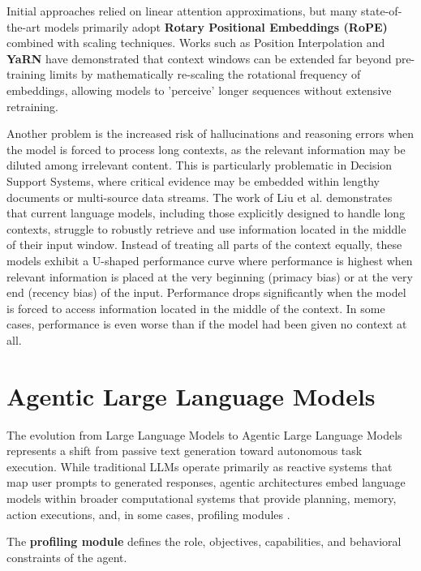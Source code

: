 Initial approaches relied on linear attention approximations, but many state-of-the-art models primarily adopt \textbf{Rotary Positional Embeddings (RoPE)} \cite{su2024roformer}combined with scaling techniques. Works such as Position Interpolation \cite{chen2023extendingcontextwindowlarge} and \textbf{YaRN} \cite{peng2023yarn} have demonstrated that context windows can be extended far beyond pre-training limits by mathematically re-scaling the rotational frequency of embeddings, allowing models to 'perceive' longer sequences without extensive retraining.

Another problem is the increased risk of hallucinations and reasoning errors when the model is forced to process long contexts, as the relevant information may be diluted among irrelevant content. This is particularly problematic in Decision Support Systems, where critical evidence may be embedded within lengthy documents or multi-source data streams. The work of Liu et al. \cite{liu-etal-2024-lost} demonstrates that current language models, including those explicitly designed to handle long contexts, struggle to robustly retrieve and use information located in the middle of their input window. Instead of treating all parts of the context equally, these models exhibit a U-shaped performance curve where performance is highest when relevant information is placed at the very beginning (primacy bias) or at the very end (recency bias) of the input. Performance drops significantly when the model is forced to access information located in the middle of the context. In some cases, performance is even worse than if the model had been given no context at all.




\section{Agentic Large Language Models}
The evolution from Large Language Models to Agentic Large Language Models represents a shift from passive text generation toward autonomous task execution. While traditional LLMs operate primarily as reactive systems that map user prompts to generated responses, agentic architectures embed language models within broader computational systems that provide planning, memory, action executions, and, in some cases, profiling modules \cite{wang2024survey}.

The \textbf{profiling module} defines the role, objectives, capabilities, and behavioral constraints of the agent.


